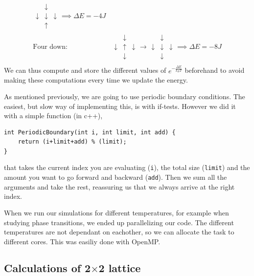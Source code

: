 \documentclass[reprint, english,notitlepage,nofootinbib]{revtex4-1}  %
\begin{document}
\begin{align*}
	\begin{matrix}
	& \downarrow  \\
	\downarrow & \downarrow & \downarrow \\
	& \uparrow
	\end{matrix}
	\implies
	\Delta E = -4J \\
	\text{Four down: }
		&\begin{matrix}
	& \downarrow  \\
	\downarrow & \uparrow & \downarrow \\
	& \downarrow
	\end{matrix}
	\rightarrow
	\begin{matrix}
	& \downarrow  \\
	\downarrow & \downarrow & \downarrow \\
	& \downarrow
	\end{matrix}
	\implies
	\Delta E = -8J \\
\end{align*}
We can thus compute and store the different values of $e^{- \frac{\Delta E}{k_BT}}$ beforehand to avoid making these computations every time we update the energy.

As mentioned previously, we are going to use periodic boundary conditions. The easiest, but slow way of implementing this, is with if-tests. However we did it with a simple function (in c++),
\begin{lstlisting}
int PeriodicBoundary(int i, int limit, int add) {
	return (i+limit+add) % (limit);
}
\end{lstlisting}
that takes the current index you are evaluating (\texttt{i}), the total size (\texttt{limit}) and the amount you want to go forward and backward (\texttt{add}). Then we sum all the arguments and take the rest, reassuring us that we always arrive at the right index.

When we run our simulations for different temperatures, for example when studying phase transitions, we ended up parallelizing our code. The different temperatures are not dependant on eachother, so we can allocate the task to different cores. This was easiliy done with OpenMP.

\subsection{Calculations of 2$\times$2 lattice} \label{calc_of_22_lattice}
\end{document}
